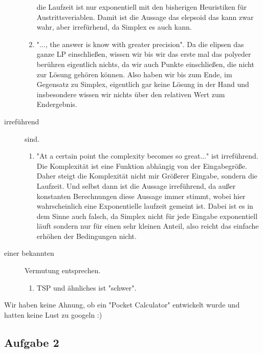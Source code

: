 \documentclass[11pt,a4paper,ngerman]{article}
\begin{document}
\begin{description}
\begin{enumerate}[1.]
                die Laufzeit ist nur exponentiell mit den bisherigen Heuristiken für Austrittsveriablen.
                Damit ist die Aussage das elepsoid das kann zwar wahr, aber irrefürhend, da Simplex es auch kann.
            \item "..., the answer is know with greater precision". Da die elipsen das ganze LP einschließen, wissen
                wir bis wir das erste mal das polyeder berühren eigentlich nichts, da wir auch Punkte einschließen, die
                nicht zur Lösung gehören können. Also haben wir bis zum Ende, im Gegensatz zu Simplex, eigentlich
                gar keine Lösung in der Hand und insbesondere wissen wir nichts über den relativen Wert zum Endergebnis.
        \end{enumerate}
    \item[irreführend] sind.\\
        \begin{enumerate}[1.]
            \item "At a certain point the complexity becomes so great..." ist irreführend.
                Die Komplexität ist eine Funktion abhängig von der Eingabegröße. Daher steigt
                die Komplexität nicht mir Größerer Eingabe, sondern die Laufzeit. Und selbst
                dann ist die Aussage irreführend, da außer konstanten Berechnungen diese
                Aussage immer stimmt, wobei hier wahrscheinlich eine Exponentielle laufzeit gemeint ist.
                Dabei ist es in dem Sinne auch falsch, da Simplex nicht für jede Eingabe exponentiell läuft
                sondern nur für einen sehr kleinen Anteil, also reicht das einfache erhöhen der Bedingungen nicht.
        \end{enumerate}
    \item[einer bekannten] Vermutung entsprechen.\\
        \begin{enumerate}[1.]
            \item TSP und ähnliches ist "schwer".
        \end{enumerate}
\end{description}

Wir haben keine Ahnung, ob ein "Pocket Calculator" entwickelt wurde und hatten keine Lust zu googeln :)

\subsection*{Aufgabe 2}
\end{document}
